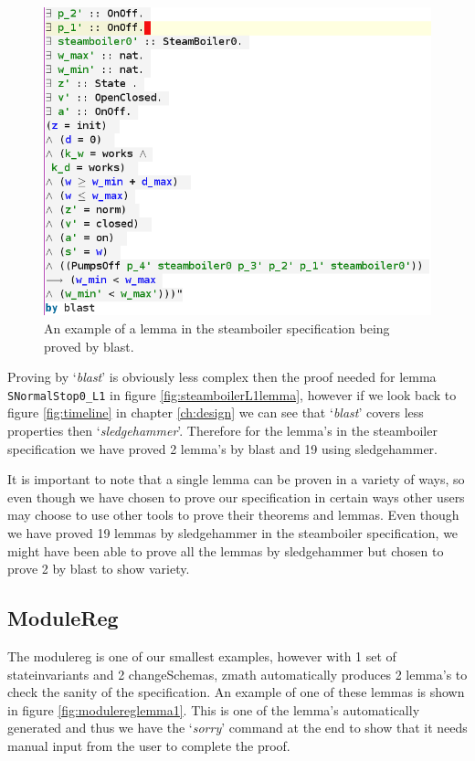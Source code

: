 \begin{figure}[H]
\centering
\includegraphics[scale=0.6]{Figures/Evaluation/steamboilerblastlemma.png}
\caption{An example of a lemma in the steamboiler specification being proved by blast. \label{fig:blastprovenlemma}}
\end{figure}

Proving by `\emph{blast}' is obviously less complex then the proof needed for
lemma \verb|SNormalStop0_L1| in figure \ref{fig:steamboilerL1lemma}, however if
we look back to figure \ref{fig:timeline} in chapter \ref{ch:design} we can see
that `\emph{blast}' covers less properties then `\emph{sledgehammer}'. Therefore
for the lemma's in the steamboiler specification we have proved 2 lemma's by
blast and 19 using sledgehammer. 

It is important to note that a single lemma can be proven in a variety of ways,
so even though we have chosen to prove our specification in certain ways other
users may choose to use other tools to prove their theorems and lemmas. Even
though we have proved 19 lemmas by sledgehammer in the steamboiler
specification, we might have been able to prove all the lemmas by sledgehammer
but chosen to prove 2 by blast to show variety.

\subsection{ModuleReg}

The modulereg is one of our smallest examples, however with 1 set of
stateinvariants and 2 changeSchemas, \gls{zmath} automatically produces 2 lemma's
to check the sanity of the specification. An example of one of these lemmas is
shown in figure \ref{fig:modulereglemma1}. This is one of the lemma's
automatically generated and thus we have the `\emph{sorry}' command at the end
to show that it needs manual input from the user to complete the proof.

